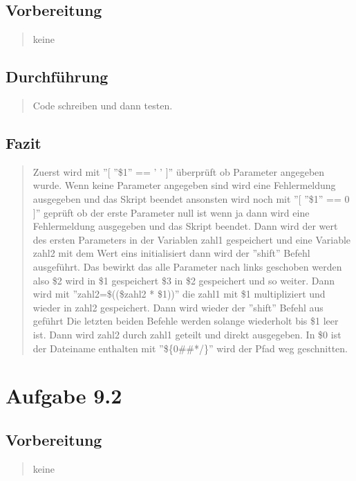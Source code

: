 	\subsection{Vorbereitung}
		\begin{quote}
			keine\\
		\end{quote}
	\subsection{Durchführung}
		\begin{quote}
			Code schreiben und dann testen.\\
		\end{quote}
	\subsection{Fazit}
		\begin{quote}
			
			Zuerst wird mit ''[ ''\$1'' == ' ' ]'' \"uberpr\"uft ob Parameter angegeben wurde. Wenn keine Parameter angegeben sind wird eine Fehlermeldung ausgegeben und das Skript beendet ansonsten wird noch mit ''[ ''\$1'' == 0 ]'' gepr\"uft ob der erste Parameter null ist wenn ja dann wird eine Fehlermeldung ausgegeben und das Skript beendet. Dann wird der wert des ersten Parameters in der Variablen zahl1 gespeichert und eine Variable zahl2 mit dem Wert eins initialisiert dann wird der ''shift'' Befehl ausgef\"uhrt. Das bewirkt das alle Parameter nach links geschoben werden also \$2 wird in \$1 gespeichert \$3 in \$2 gespeichert und so weiter. Dann wird mit ''zahl2=\$((\$zahl2 * \$1))'' die zahl1 mit \$1 multipliziert und wieder in zahl2 gespeichert. Dann wird wieder der ''shift'' Befehl aus gef\"uhrt Die letzten beiden Befehle werden solange wiederholt bis \$1 leer ist. Dann wird zahl2 durch zahl1 geteilt und direkt ausgegeben. In \$0 ist der Dateiname enthalten mit ''\$\{0\#\#*/\}'' wird der Pfad weg geschnitten.\\
		\end{quote}

\section{Aufgabe 9.2}
	\subsection{Vorbereitung}
		\begin{quote}
			keine\\
		\end{quote}
